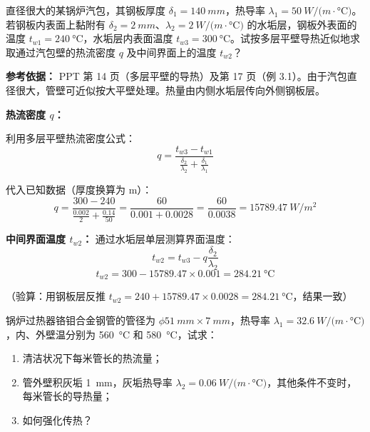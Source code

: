 \begin{problem}[锅炉汽包多层平壁导热计算]
直径很大的某锅炉汽包，其钢板厚度 \(\delta_1 = \qty{140}{mm}\)，热导率 \(\lambda_1 = \qty{50}{W/(m\cdot\degreeCelsius)}\)。若钢板内表面上黏附有 \(\delta_2 = \qty{2}{mm}\)、\(\lambda_2 = \qty{2}{W/(m\cdot\degreeCelsius)}\) 的水垢层，钢板外表面的温度 \(t_{w1} = \qty{240}{\degreeCelsius}\)，水垢层内表面温度 \(t_{w3} = \qty{300}{\degreeCelsius}\)。试按多层平壁导热近似地求取通过汽包壁的热流密度 \(q\) 及中间界面上的温度 \(t_{w2}\)？
\end{problem}

\begin{solution}
\textbf{参考依据：} PPT 第 14 页（多层平壁的导热）及第 17 页（例 3.1）。由于汽包直径很大，管壁可近似按大平壁处理。热量由内侧水垢层传向外侧钢板层。

\textbf{热流密度 \(q\)：}

利用多层平壁热流密度公式：
\begin{equation*}
  q = \frac{t_{w3} - t_{w1}}{\frac{\delta_2}{\lambda_2} + \frac{\delta_1}{\lambda_1}}
\end{equation*}

代入已知数据（厚度换算为 \unit{m}）：
\begin{equation*}
  q = \frac{300 - 240}{\frac{0.002}{2} + \frac{0.14}{50}} = \frac{60}{0.001 + 0.0028} = \frac{60}{0.0038} = \qty{15789.47}{W/m^2}
\end{equation*}

\textbf{中间界面温度 \(t_{w2}\)：} 通过水垢层单层测算界面温度：
\begin{equation*}
  t_{w2} = t_{w3} - q \frac{\delta_2}{\lambda_2}
\end{equation*}
\begin{equation*}
  t_{w2} = 300 - 15789.47 \times 0.001 = \qty{284.21}{\degreeCelsius}
\end{equation*}

（验算：用钢板层反推 \(t_{w2} = 240 + 15789.47 \times 0.0028 = \qty{284.21}{\degreeCelsius}\)，结果一致）
\end{solution}

\begin{problem}[过热器圆筒壁导热计算及强化传热]
锅炉过热器铬钼合金钢管的管径为 \(\phi \qty{51}{mm} \times \qty{7}{mm}\)，热导率 \(\lambda_1 = \qty{32.6}{W/(m\cdot\degreeCelsius)}\)，内、外壁温分别为 \qty{560}{\degreeCelsius} 和 \qty{580}{\degreeCelsius}，试求：
\begin{enumerate}
  \item 清洁状况下每米管长的热流量；
  \item 管外壁积灰垢 \qty{1}{mm}，灰垢热导率 \(\lambda_2 = \qty{0.06}{W/(m\cdot\degreeCelsius)}\)，其他条件不变时，每米管长的导热量；
  \item 如何强化传热？
\end{enumerate}
\end{problem}

